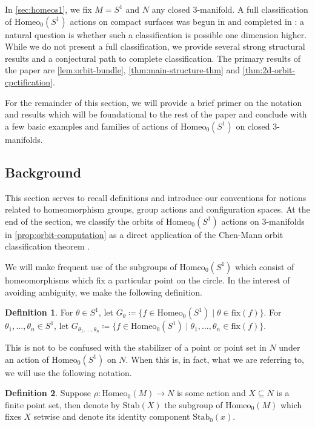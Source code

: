 \documentclass[10pt, oneside]{article}
\newcommand{\homeo}[1][S^1]{\text{Homeo}_0(#1)}
\newcommand{\stab}[1]{\text{Stab}(#1)}
\newcommand{\pstab}[1]{\text{Stab}_0(#1)}
\theoremstyle{definition}
\newtheorem{defn}{Definition}[section]
\theoremstyle{definition}
\begin{document}
In \cref{sec:homeos1}, we fix $M = S^1$ and $N$ any closed 3-manifold. A full classification of $\homeo[S^1]$ actions on compact surfaces was begun in \cite{militon_actions_2016} and completed in \cite{chen_structure_2023}: a natural question is whether such a classification is possible one dimension higher. While we do not present a full classification, we provide several strong structural results and a conjectural path to complete classification. The primary results of the paper are \cref{lem:orbit-bundle}, \cref{thm:main-structure-thm} and \cref{thm:2d-orbit-cpctification}. 

For the remainder of this section, we will provide a brief primer on the notation and results which will be foundational to the rest of the paper and conclude with a few basic examples and families of actions of $\homeo$ on closed 3-manifolds.

\subsection{Background}
This section serves to recall definitions and introduce our conventions for notions related to homeomorphism groups, group actions and configuration spaces. At the end of the section, we classify the orbits of $\homeo$ actions on 3-manifolds in \cref{prop:orbit-computation} as a direct application of the Chen-Mann orbit classification theorem \cite{chen_structure_2023}.

We will make frequent use of the subgroups of $\homeo$ which consist of homeomorphisms which fix a particular point on the circle. In the interest of avoiding ambiguity, we make the following definition.

\begin{defn}
     For $\theta\in S^1$, let $G_\theta\coloneqq\{f\in\homeo[S^1]\;\vert\; \theta\in\text{fix}(f)\}$.
     For $\theta_1,\dots,\theta_n\in S^1$, let $G_{\theta_1,\dots,\theta_n}\coloneqq \{f\in\homeo\;\vert\; \theta_1,\dots,\theta_n\in\text{fix}(f)\}$.
\end{defn}

This is not to be confused with the stabilizer of a point or point set in $N$ under an action of $\homeo$ on $N$. When this is, in fact, what we are referring to, we will use the following notation.

\begin{defn}
    Suppose $\rho: \homeo[M]\to N$ is some action and $X\subseteq N$ is a finite point set, then denote by $\stab{X}$ the subgroup of $\homeo[M]$ which fixes $X$ setwise and denote its identity component $\pstab{x}$. 
\end{defn} 
\end{document}
